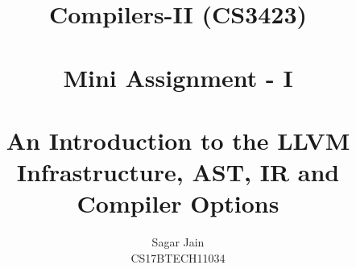 \documentclass[12pt]{article}
\begin{document}
\title{\textbf{Compilers-II  (CS3423)}\\~\\Mini Assignment - I\\~\\An Introduction to the LLVM Infrastructure, AST, IR and Compiler Options}
\author{Sagar Jain\\CS17BTECH11034}
\maketitle
\begin{normalsize}
\tableofcontents
\end{normalsize}
\end{document}
